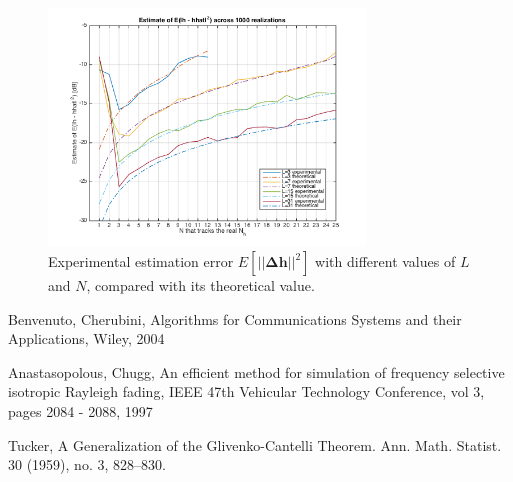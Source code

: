 \documentclass[10pt]{article}
\begin{document}
\begin{figure}[ht] %
	\centering
	\includegraphics[width=0.75\textwidth]{p02_comparetheoreticaldeltah}
	\caption{Experimental estimation error $E[||\mathbf{\Delta h}||^2]$ with different values of $L$ and $N$, compared with its theoretical value.}
    \label{fig:p02_comparetheoreticaldeltah}
\end{figure}


\begin{thebibliography}{10}

Benvenuto, Cherubini, Algorithms for Communications Systems and their Applications, Wiley, 2004

Anastasopolous, Chugg, An efficient method for simulation of frequency selective isotropic Rayleigh fading, IEEE 47th Vehicular Technology Conference, vol 3, pages 2084 - 2088, 1997

Tucker, A Generalization of the Glivenko-Cantelli Theorem. Ann. Math. Statist. 30 (1959), no. 3, 828--830.

\end{thebibliography}
\end{document}
